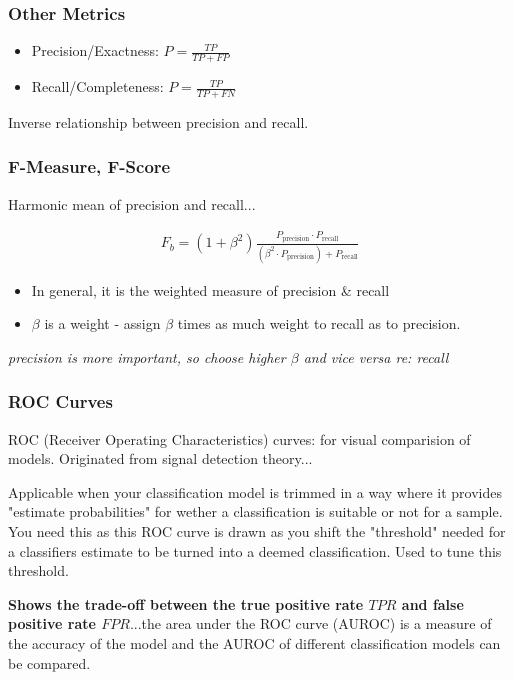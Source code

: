 \documentclass{article}
\begin{document}
\subsubsection{Other Metrics}
\begin{itemize}
	\item Precision/Exactness: $P = \frac{TP}{TP + FP}$
	\item Recall/Completeness: $P = \frac{TP}{TP + FN}$
\end{itemize}

Inverse relationship between precision and recall.

\subsubsection{F-Measure, F-Score}
Harmonic mean of precision and recall...

\begin{align*}
	F_{b} = (1 + \beta^2) \frac{P_{\text{precision}} \cdot P_{\text{recall}}}{(\beta^2 \cdot P_{\text{precision}}) + P_{\text{recall}}}
\end{align*}

\begin{itemize}
	\item In general, it is the weighted measure of precision \& recall
	\item $\beta$ is a weight - assign $\beta$ times as much weight to recall as to precision.
\end{itemize}

{\em precision is more important, so choose higher $\beta$ and vice versa re: recall}

\subsubsection{ROC Curves}
ROC (Receiver Operating Characteristics) curves: for visual comparision of models. Originated from signal detection theory...

Applicable when your classification model is trimmed in a way where it provides "estimate probabilities" for wether a classification is suitable or not for a sample. You need this as this ROC curve is drawn as you shift the "threshold" needed for a classifiers estimate to be turned into a deemed classification. Used to tune this threshold.

{\bf Shows the trade-off between the true positive rate $TPR$ and false positive rate $FPR$}...the area under the ROC curve (AUROC) is a measure of the accuracy of the model and the AUROC of different classification models can be compared.
\end{document}
